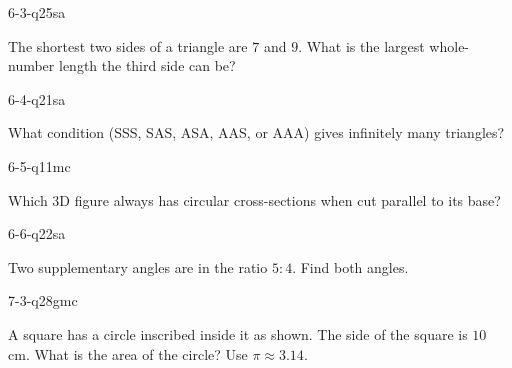\begin{practiceQuestion}{6-3-q25}{sa}
\begin{questionText}
The shortest two sides of a triangle are $7$ and $9$. What is the largest whole-number length the third side can be?
\end{questionText}
\end{practiceQuestion}

\begin{practiceQuestion}{6-4-q21}{sa}
\begin{questionText}
What condition (SSS, SAS, ASA, AAS, or AAA) gives infinitely many triangles?
\end{questionText}
\end{practiceQuestion}

\begin{practiceQuestion}{6-5-q11}{mc}
\begin{questionText}
Which 3D figure always has circular cross-sections when cut parallel to its base?
\end{questionText}
\end{practiceQuestion}

\begin{practiceQuestion}{6-6-q22}{sa}
\begin{questionText}
Two supplementary angles are in the ratio $5:4$. Find both angles.
\end{questionText}
\end{practiceQuestion}

\begin{practiceQuestion}{7-3-q28}{gmc}
\begin{questionText}
A square has a circle inscribed inside it as shown. The side of the square is $10$ cm. What is the area of the circle? Use $\pi \approx 3.14$.

\begin{center}
\end{center}
\end{questionText}
\end{practiceQuestion}

